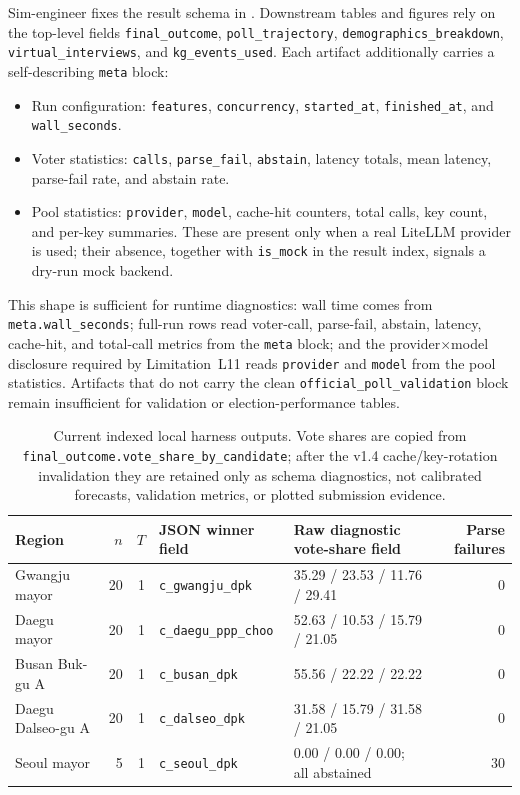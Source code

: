 \documentclass[11pt]{article}
\begin{document}
Sim-engineer fixes the result schema in . Downstream tables and figures rely on the top-level fields \texttt{final\_outcome}, \texttt{poll\_trajectory}, \texttt{demographics\_breakdown}, \texttt{virtual\_interviews}, and \texttt{kg\_events\_used}. Each artifact additionally carries a self-describing \texttt{meta} block:
\begin{itemize}
  \item Run configuration: \texttt{features}, \texttt{concurrency}, \texttt{started\_at}, \texttt{finished\_at}, and \texttt{wall\_seconds}.
  \item Voter statistics: \texttt{calls}, \texttt{parse\_fail}, \texttt{abstain}, latency totals, mean latency, parse-fail rate, and abstain rate.
  \item Pool statistics: \texttt{provider}, \texttt{model}, cache-hit counters, total calls, key count, and per-key summaries. These are present only when a real LiteLLM provider is used; their absence, together with \texttt{is\_mock} in the result index, signals a dry-run mock backend.
\end{itemize}
This shape is sufficient for runtime diagnostics: wall time comes from \texttt{meta.wall\_seconds}; full-run rows read voter-call, parse-fail, abstain, latency, cache-hit, and total-call metrics from the \texttt{meta} block; and the provider$\times$model disclosure required by Limitation~L11 reads \texttt{provider} and \texttt{model} from the pool statistics. Artifacts that do not carry the clean \texttt{official\_poll\_validation} block remain insufficient for validation or election-performance tables.

\begin{table}[h]
\centering
\caption{Current indexed local harness outputs. Vote shares are copied from \texttt{final\_outcome.vote\_share\_by\_candidate}; after the v1.4 cache/key-rotation invalidation they are retained only as schema diagnostics, not calibrated forecasts, validation metrics, or plotted submission evidence.}
\label{tab:local-harness-results}
\small
\setlength{\tabcolsep}{4pt}
\begin{tabularx}{\textwidth}{YrrYYr}
\toprule
Region & $n$ & $T$ & JSON winner field & Raw diagnostic vote-share field & Parse failures \\
\midrule
Gwangju mayor & 20 & 1 & \texttt{c\_gwangju\_dpk} & 35.29 / 23.53 / 11.76 / 29.41 & 0 \\
Daegu mayor & 20 & 1 & \texttt{c\_daegu\_ppp\_choo} & 52.63 / 10.53 / 15.79 / 21.05 & 0 \\
Busan Buk-gu A & 20 & 1 & \texttt{c\_busan\_dpk} & 55.56 / 22.22 / 22.22 & 0 \\
Daegu Dalseo-gu A & 20 & 1 & \texttt{c\_dalseo\_dpk} & 31.58 / 15.79 / 31.58 / 21.05 & 0 \\
Seoul mayor & 5 & 1 & \texttt{c\_seoul\_dpk} & 0.00 / 0.00 / 0.00; all abstained & 30 \\
\bottomrule
\end{tabularx}
\end{table}
\end{document}
